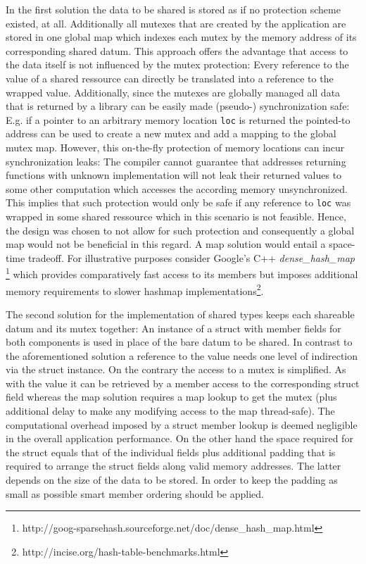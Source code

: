In the first solution the data to be shared is stored as if no protection scheme existed, at all. Additionally all mutexes that are created by the application are stored in one global map which indexes each mutex by the memory address of its corresponding shared datum. This approach offers the advantage that access to the data itself is not influenced by the mutex protection: Every reference to the value of a shared ressource  can directly be translated into a reference to the wrapped value. Additionally, since the mutexes are globally managed all data that is returned by a library can be easily made (pseudo-) synchronization safe: E.g. if a pointer to an arbitrary memory location \texttt{loc} is returned the pointed-to address can be used to create a new mutex and add a mapping to the global mutex map. However, this on-the-fly protection of memory locations can incur synchronization leaks: The compiler cannot guarantee that addresses returning functions with unknown implementation will not leak their returned values to some other computation which accesses the according memory unsynchronized. This implies that such protection would only be safe if any reference to \texttt{loc} was wrapped in some shared ressource which in this scenario is not feasible. Hence, the design was chosen to not allow for such protection and consequently a global map would not be beneficial in this regard. A map solution would entail a space-time tradeoff. For illustrative purposes consider Google's C++ \textit{dense\_hash\_map} \footnote{http://goog-sparsehash.sourceforge.net/doc/dense\_hash\_map.html} which provides comparatively fast access to its members but imposes additional memory requirements to slower hashmap implementations\footnote{http://incise.org/hash-table-benchmarks.html}. 

The second solution for the implementation of shared types keeps each shareable datum and its mutex together: An instance of a struct with member fields for both components is used in place of the bare datum to be shared. In contrast to the aforementioned solution a reference to the value  needs one level of indirection via the struct instance. On the contrary the access to a mutex is simplified. As with the value it can be retrieved by a member access to the corresponding struct field whereas the map solution requires a map lookup to get the mutex (plus additional delay to make any modifying access to the map thread-safe). The computational overhead imposed by a struct member lookup is deemed negligible in the overall application performance. On the other hand the space required for the struct equals that of the individual fields plus additional padding\cite[pp.~303 ff.]{LinuxSystemProgramming} that is required to arrange the struct fields along valid memory addresses. The latter depends on the size of the data to be stored. In order to keep the padding as small as possible smart member ordering should be applied. 

